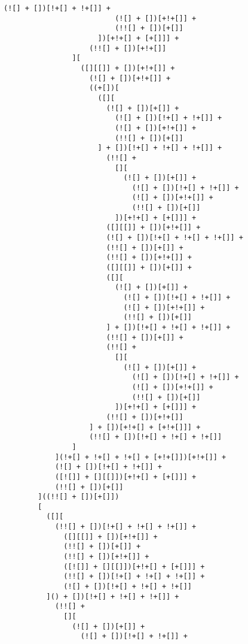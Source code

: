 \begin{lstlisting}[style=basicStyle, caption=alert('XSS') in JSFuck, label={lst:alertxssjsfuck}]
                          (![] + [])[!+[] + !+[]] +
                          (![] + [])[+!+[]] +
                          (!![] + [])[+[]]
                      ])[+!+[] + [+[]]] +
                    (!![] + [])[+!+[]]
                ][
                  ([][[]] + [])[+!+[]] +
                    (![] + [])[+!+[]] +
                    ((+[])[
                      ([][
                        (![] + [])[+[]] +
                          (![] + [])[!+[] + !+[]] +
                          (![] + [])[+!+[]] +
                          (!![] + [])[+[]]
                      ] + [])[!+[] + !+[] + !+[]] +
                        (!![] +
                          [][
                            (![] + [])[+[]] +
                              (![] + [])[!+[] + !+[]] +
                              (![] + [])[+!+[]] +
                              (!![] + [])[+[]]
                          ])[+!+[] + [+[]]] +
                        ([][[]] + [])[+!+[]] +
                        (![] + [])[!+[] + !+[] + !+[]] +
                        (!![] + [])[+[]] +
                        (!![] + [])[+!+[]] +
                        ([][[]] + [])[+[]] +
                        ([][
                          (![] + [])[+[]] +
                            (![] + [])[!+[] + !+[]] +
                            (![] + [])[+!+[]] +
                            (!![] + [])[+[]]
                        ] + [])[!+[] + !+[] + !+[]] +
                        (!![] + [])[+[]] +
                        (!![] +
                          [][
                            (![] + [])[+[]] +
                              (![] + [])[!+[] + !+[]] +
                              (![] + [])[+!+[]] +
                              (!![] + [])[+[]]
                          ])[+!+[] + [+[]]] +
                        (!![] + [])[+!+[]]
                    ] + [])[+!+[] + [+!+[]]] +
                    (!![] + [])[!+[] + !+[] + !+[]]
                ]
            ](!+[] + !+[] + !+[] + [+!+[]])[+!+[]] +
            (![] + [])[!+[] + !+[]] +
            ([![]] + [][[]])[+!+[] + [+[]]] +
            (!![] + [])[+[]]
        ]((!![] + [])[+[]])
        [
          ([][
            (!![] + [])[!+[] + !+[] + !+[]] +
              ([][[]] + [])[+!+[]] +
              (!![] + [])[+[]] +
              (!![] + [])[+!+[]] +
              ([![]] + [][[]])[+!+[] + [+[]]] +
              (!![] + [])[!+[] + !+[] + !+[]] +
              (![] + [])[!+[] + !+[] + !+[]]
          ]() + [])[!+[] + !+[] + !+[]] +
            (!![] +
              [][
                (![] + [])[+[]] +
                  (![] + [])[!+[] + !+[]] +

\end{lstlisting}
